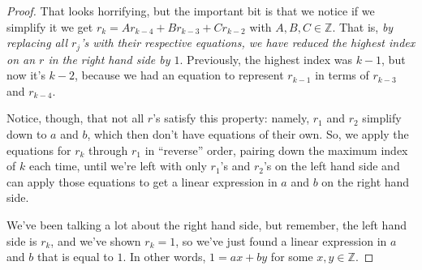 \documentclass{article}
\numberwithin{equation}{thm}
\begin{document}
\begin{proof}
  That looks horrifying, but the important bit is that we notice if we simplify it we get $r_k = Ar_{k-4} + Br_{k-3} + Cr_{k-2}$ with $A, B, C \in \mathbb{Z}$. That is, \emph{by replacing all $r_j$'s with their respective equations, we have reduced the highest index on an $r$ in the right hand side by $1$}. Previously, the highest index was $k-1$, but now it's $k-2$, because we had an equation to represent $r_{k-1}$ in terms of $r_{k-3}$ and $r_{k-4}$.

  Notice, though, that not all $r$'s satisfy this property: namely, $r_1$ and $r_2$ simplify down to $a$ and $b$, which then don't have equations of their own. So, we apply the equations for $r_k$ through $r_1$ in ``reverse'' order, pairing down the maximum index of $k$ each time, until we're left with only $r_1$'s and $r_2$'s on the left hand side and can apply those equations to get a linear expression in $a$ and $b$ on the right hand side.

  We've been talking a lot about the right hand side, but remember, the left hand side is $r_k$, and we've shown $r_k = 1$, so we've just found a linear expression in $a$ and $b$ that is equal to $1$. In other words, $1 = ax + by$ for some $x, y \in \mathbb{Z}$.


\end{proof}
\end{document}
